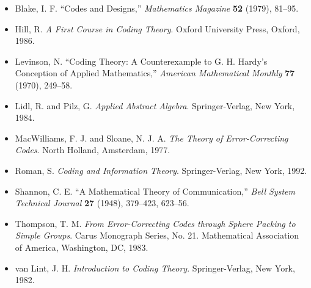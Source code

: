 {\small
\begin{itemize}
 
\item[{\bf [1]}]
Blake, I. F. ``Codes and Designs,'' {\it Mathematics Magazine} {\bf
52} (1979), 81--95. 
 
\item[{\bf [2]}]
Hill, R. {\it A First Course in Coding Theory}. Oxford University
Press, Oxford, 1986. 
 
\item[{\bf [3]}]
Levinson, N. ``Coding Theory: A Counterexample to G. H. Hardy's
Conception of Applied Mathematics,'' {\it American Mathematical
Monthly} {\bf 77} (1970), 249--58. 
 
\item[{ \bf [4]}]
Lidl, R. and Pilz, G. {\it Applied Abstract Algebra}. Springer-Verlag,
New York, 1984. 
 
\item[{\bf [5]}]
MacWilliams, F. J. and Sloane, N. J. A. {\it The Theory of
Error-Correcting Codes}. North Holland, Amsterdam, 1977. 
 
 
\item[{\bf [6]}]
Roman, S. {\it Coding and Information Theory}. Springer-Verlag,
New York, 1992. 
 
 
\item[{\bf [7]}]
Shannon, C. E. ``A Mathematical Theory of Communication,'' {\it Bell
System Technical Journal} {\bf 27} (1948), 379--423, 623--56.
 
\item[{\bf [8]}]
Thompson, T. M. {\it From Error-Correcting Codes through Sphere
Packing to Simple Groups}. Carus Monograph Series, No. 21. Mathematical
Association of America, Washington, DC, 1983. 
 
\item[{\bf [9]}]
van Lint, J. H. {\it Introduction to Coding Theory}. Springer-Verlag,
New York, 1982. 
 
\end{itemize}
}
 
 
 
 
 
 
